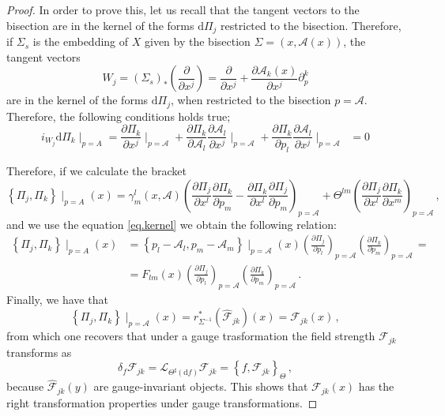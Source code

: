 \documentclass[10pt,a4paper]{amsart}
\newcommand{\be}{\begin{equation}}
\newcommand{\dd}{\mathrm{d}}
\newcommand{\ee}{\end{equation}}
\begin{document}
\begin{proof}
In order to prove this, let us recall that the tangent vectors to the bisection are in the kernel of the forms $\dd \Pi_{j}$ restricted to the bisection. Therefore, if $\Sigma_s$ is the embedding of $X$ given by the bisection $\Sigma=(x,\mathcal{A}(x))$, the tangent vectors 
\be
W_j = (\Sigma_s)_*\left( \frac{\partial}{\partial x^j} \right) = \frac{\partial}{\partial x^j} + \frac{\partial \mathcal{A}_k(x)}{\partial x^j}\partial_p^k
\ee
are in the kernel of the forms $\dd \Pi_j$, when restricted to the bisection $p=\mathcal{A}$. Therefore, the following conditions holds true;
\begin{equation}\label{eq.kernel}
i_{W_j}\dd \Pi_k\mid_{p=A} = \frac{\partial \Pi_k}{\partial x^{j}} \mid_{p=\mathcal{A}} + \frac{\partial \Pi_k}{\partial \mathcal{A}_{l}}\frac{\partial \mathcal{A}_l}{\partial x^{j}}\mid_{p=\mathcal{A}} + \frac{\partial \Pi_k}{\partial p_{l}}\frac{\partial \mathcal{A}_l}{\partial x^{j}}\mid_{p=\mathcal{A}} \;\;= 0
\end{equation}

Therefore, if we calculate the bracket
\begin{equation}
\left\lbrace \Pi_j, \Pi_k \right\rbrace \mid_{p=A}(x) = \gamma^{l}_{m}(x,\mathcal{A}) \left( \frac{\partial \Pi_j}{\partial x^l} \frac{\partial \Pi_k}{\partial p_m} - \frac{\partial \Pi_k}{\partial x^l}\frac{\partial \Pi_j}{\partial p_m} \right)_{p=\mathcal{A}} + \Theta^{lm}\left( \frac{\partial \Pi_j}{\partial x^l}\frac{\partial \Pi_k}{\partial x^m} \right)_{p=\mathcal{A}}\,,
\end{equation}
and we use the equation \eqref{eq.kernel} we obtain the following relation:
\begin{equation}
\begin{split}
\left\lbrace \Pi_j, \Pi_k \right\rbrace \mid_{p=A}(x) &= \left\lbrace p_l - \mathcal{A}_l, p_m-\mathcal{A}_m \right\rbrace\mid_{p=\mathcal{A}} (x)\left( \frac{\partial \Pi_j}{\partial p_l}\right)_{p=\mathcal{A}} \left( \frac{\partial \Pi_k}{\partial p_m} \right)_{p=\mathcal{A}}\, = \\ &=F_{lm}(x)\left( \frac{\partial \Pi_j}{\partial p_l}\right)_{p=\mathcal{A}} \left( \frac{\partial \Pi_k}{\partial p_m} \right)_{p=\mathcal{A}}\,.
\end{split}
\end{equation}
Finally, we have that 
\begin{equation}
\left\lbrace \Pi_j, \Pi_k \right\rbrace \mid_{p=\mathcal{A}} (x)= r_{\Sigma^{-1}}^*(\widehat{\mathcal{F}}_{jk})(x) = \mathcal{F}_{jk} (x)\,,
\end{equation}
from which one recovers that under a gauge trasformation the field strength ${\mathcal{F}}_{jk}$ transforms as 
\begin{equation}
\delta_f {\mathcal{F}}_{jk} = \mathcal{L}_{{\Theta^{\sharp}(\dd f)}} {\mathcal{F}}_{jk} = \left\lbrace f, {\mathcal{F}}_{jk} \right\rbrace_{\Theta}\,,
\end{equation}
because $\widehat{\mathcal{F}}_{jk}(y)$ are gauge-invariant objects. This shows that $\mathcal{F}_{jk}(x)$ has the right transformation properties under gauge transformations.
\end{proof}
\end{document}
